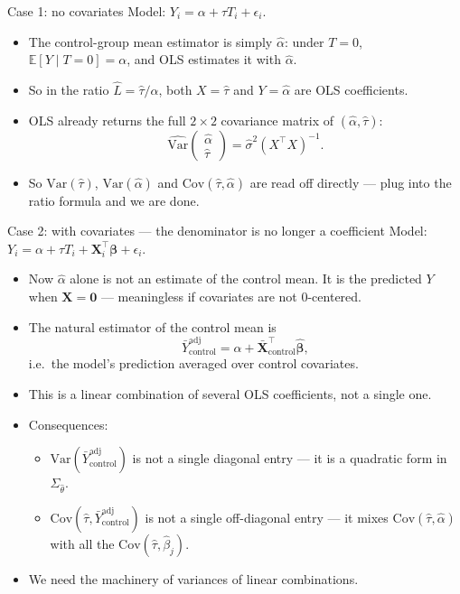 \documentclass[10pt]{beamer}
\begin{document}
\begin{frame}{Case 1: no covariates}
Model: $Y_i = \alpha + \tau T_i + \epsilon_i$.
\begin{itemize}
  \item The control-group mean estimator is simply $\hat\alpha$: under $T=0$, $\mathbb{E}[Y\mid T=0] = \alpha$, and OLS estimates it with $\hat\alpha$.
  \item So in the ratio $\hat L = \hat\tau / \hat\alpha$, both $X = \hat\tau$ and $Y = \hat\alpha$ are \alert{OLS coefficients}.
  \item OLS already returns the full $2\times 2$ covariance matrix of $(\hat\alpha, \hat\tau)$:
  \[
  \widehat{\mathrm{Var}}\begin{pmatrix}\hat\alpha\\\hat\tau\end{pmatrix}
  = \hat\sigma^2 (X^\top X)^{-1}.
  \]
  \item So $\mathrm{Var}(\hat\tau)$, $\mathrm{Var}(\hat\alpha)$ and $\mathrm{Cov}(\hat\tau,\hat\alpha)$ are read off directly --- plug into the ratio formula and we are done.
\end{itemize}
\end{frame}

\begin{frame}{Case 2: with covariates --- the denominator is no longer a coefficient}
Model: $Y_i = \alpha + \tau T_i + \mathbf{X}_i^\top \bm\beta + \epsilon_i$.
\begin{itemize}
  \item Now $\hat\alpha$ alone is \alert{not} an estimate of the control mean. It is the predicted $Y$ when $\mathbf{X} = \mathbf{0}$ --- meaningless if covariates are not 0-centered.
  \item The natural estimator of the control mean is
  \[
  \bar{Y}^{\text{adj}}_{\text{control}} = \hat\alpha + \bar{\mathbf{X}}_{\text{control}}^\top \hat{\bm\beta},
  \]
  i.e.\ the model's prediction averaged over control covariates.
  \item This is a \alert{linear combination of several OLS coefficients}, not a single one.
  \item Consequences:
  \begin{itemize}
    \item $\mathrm{Var}(\bar{Y}^{\text{adj}}_{\text{control}})$ is not a single diagonal entry --- it is a quadratic form in $\Sigma_{\hat\theta}$.
    \item $\mathrm{Cov}(\hat\tau, \bar{Y}^{\text{adj}}_{\text{control}})$ is not a single off-diagonal entry --- it mixes $\mathrm{Cov}(\hat\tau,\hat\alpha)$ with all the $\mathrm{Cov}(\hat\tau, \hat\beta_j)$.
  \end{itemize}
  \item We need the machinery of variances of linear combinations.
\end{itemize}
\end{frame}
\end{document}
